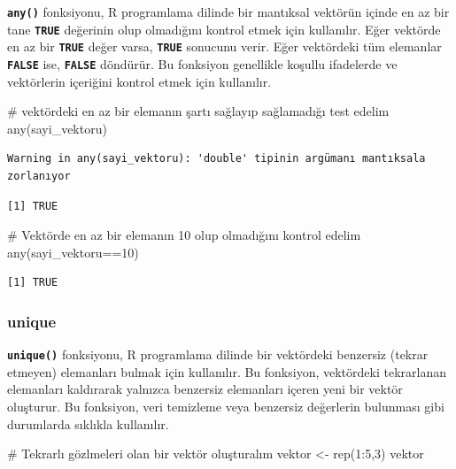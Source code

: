 \documentclass[
  letterpaper,
  DIV=11,
  numbers=noendperiod]{scrreprt}
\newenvironment{Shaded}{\begin{snugshade}}{\end{snugshade}}
\newcommand{\CommentTok}[1]{\textcolor[rgb]{0.37,0.37,0.37}{#1}}
\newcommand{\DecValTok}[1]{\textcolor[rgb]{0.68,0.00,0.00}{#1}}
\newcommand{\FunctionTok}[1]{\textcolor[rgb]{0.28,0.35,0.67}{#1}}
\newcommand{\NormalTok}[1]{\textcolor[rgb]{0.00,0.23,0.31}{#1}}
\newcommand{\OtherTok}[1]{\textcolor[rgb]{0.00,0.23,0.31}{#1}}
\newcommand{\SpecialCharTok}[1]{\textcolor[rgb]{0.37,0.37,0.37}{#1}}
\begin{document}
\textbf{\texttt{any()}} fonksiyonu, R programlama dilinde bir mantıksal
vektörün içinde en az bir tane \textbf{\texttt{TRUE}} değerinin olup
olmadığını kontrol etmek için kullanılır. Eğer vektörde en az bir
\textbf{\texttt{TRUE}} değer varsa, \textbf{\texttt{TRUE}} sonucunu
verir. Eğer vektördeki tüm elemanlar \textbf{\texttt{FALSE}} ise,
\textbf{\texttt{FALSE}} döndürür. Bu fonksiyon genellikle koşullu
ifadelerde ve vektörlerin içeriğini kontrol etmek için kullanılır.

\begin{Shaded}
\begin{Highlighting}[]
\CommentTok{\# vektördeki en az bir elemanın şartı sağlayıp sağlamadığı test edelim}
\FunctionTok{any}\NormalTok{(sayi\_vektoru) }
\end{Highlighting}
\end{Shaded}

\begin{verbatim}
Warning in any(sayi_vektoru): 'double' tipinin argümanı mantıksala zorlanıyor
\end{verbatim}

\begin{verbatim}
[1] TRUE
\end{verbatim}

\begin{Shaded}
\begin{Highlighting}[]
\CommentTok{\# Vektörde en az bir elemanın 10 olup olmadığını kontrol edelim}
\FunctionTok{any}\NormalTok{(sayi\_vektoru}\SpecialCharTok{==}\DecValTok{10}\NormalTok{) }
\end{Highlighting}
\end{Shaded}

\begin{verbatim}
[1] TRUE
\end{verbatim}

\subsubsection{\texorpdfstring{\textbf{unique}}{unique}}\label{unique}

\textbf{\texttt{unique()}} fonksiyonu, R programlama dilinde bir
vektördeki benzersiz (tekrar etmeyen) elemanları bulmak için kullanılır.
Bu fonksiyon, vektördeki tekrarlanan elemanları kaldırarak yalnızca
benzersiz elemanları içeren yeni bir vektör oluşturur. Bu fonksiyon,
veri temizleme veya benzersiz değerlerin bulunması gibi durumlarda
sıklıkla kullanılır.

\begin{Shaded}
\begin{Highlighting}[]
\CommentTok{\# Tekrarlı gözlmeleri olan bir vektör oluşturalım}
\NormalTok{vektor }\OtherTok{\textless{}{-}} \FunctionTok{rep}\NormalTok{(}\DecValTok{1}\SpecialCharTok{:}\DecValTok{5}\NormalTok{,}\DecValTok{3}\NormalTok{)}
\NormalTok{vektor}
\end{Highlighting}
\end{Shaded}
\end{document}
